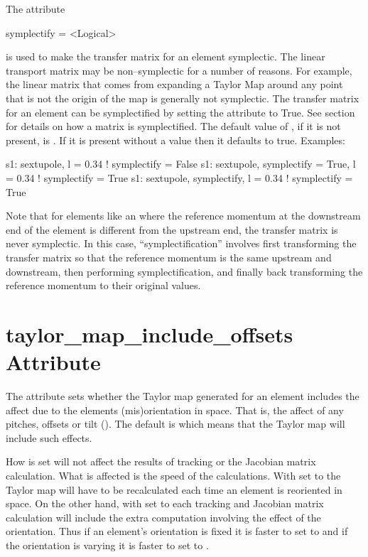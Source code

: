 The  attribute
\begin{example}
  symplectify = <Logical>
\end{example}
is used to make the transfer matrix for an element symplectic. The
linear transport matrix may be non--symplectic for a number of
reasons.  For example, the linear matrix that comes from expanding a
Taylor Map around any point that is not the origin of the map is
generally not symplectic. The transfer matrix for an element can be
symplectified by setting the  attribute to True. See
section~ for details on how a matrix is
symplectified. The default value of , if it is not
present, is . If it is present without a value then it
defaults to true. Examples:
\begin{example}
  s1: sextupole, l = 0.34                       ! symplectify = False
  s1: sextupole, symplectify = True, l = 0.34   ! symplectify = True
  s1: sextupole, symplectify, l = 0.34          ! symplectify = True
\end{example}

\label{lcavity} Note that for elements like an  where the
reference momentum at the downstream end of the element is different
from the upstream end, the transfer matrix is never symplectic. In
this case, ``symplectification'' involves first transforming the
transfer matrix so that the reference momentum is the same upstream
and downstream, then performing symplectification, and finally back
transforming the reference momentum to their original values.

\section{taylor_map_include_offsets Attribute}
\label{s:mapoff}

The  attribute sets whether the Taylor map
generated for an element includes the affect due to the elements
(mis)orientation in space. That is, the affect of any pitches, offsets
or tilt (). The default is  which means that
the Taylor map will include such effects. 

How  is set will not affect the results of
tracking or the Jacobian matrix calculation. What is affected is the
speed of the calculations. With  set to 
the Taylor map will have to be recalculated each time an element is
reoriented in space. On the other hand, with  set
to  each tracking and Jacobian matrix calculation will
include the extra computation involving the effect of the
orientation. Thus if an element's orientation is fixed it is faster to
set  to  and if the orientation is
varying it is faster to set  to .

